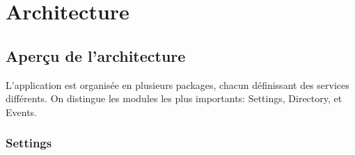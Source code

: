 \chapter{Architecture}
\section*{Aperçu de l'architecture}

\begin{figure}[h]
  \label{fig:architecture}
  \center
  \setlength\fboxsep{5pt}
  \setlength\fboxrule{0.5pt}
\end{figure}

L'application est organisée en plusieurs packages, chacun définissant des services différents. On distingue les modules les plus importants: Settings, Directory, et Events.

\newpage
\subsection*{Settings}

\begin{figure}[h!]
  \label{fig:preferences_mod}
  \center
  \setlength\fboxsep{5pt}
  \setlength\fboxrule{0.5pt}
\end{figure}

